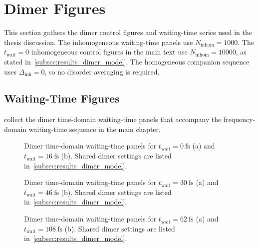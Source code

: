 \clearpage
\section{Dimer Figures}
\label{app:sec:paper_eqs_dimer}

This section gathers the dimer control figures and waiting-time series used in
the thesis discussion. The inhomogeneous waiting-time panels use
$N_{\mathrm{inhom}}=1000$. The \(t_{\mathrm{wait}}=0\) inhomogeneous control
figures in the main text use \(N_{\mathrm{inhom}}=10000\), as stated
in~\autoref{subsec:results_dimer_model}. The homogeneous companion sequence uses
\(\Delta_{\mathrm{inh}}=0\), so no disorder averaging is required.

\subsection{Waiting-Time Figures}

collect the dimer time-domain waiting-time panels that accompany the
frequency-domain waiting-time sequence in the main chapter.

\begin{figure}[htbp]
    \centering
    \caption{Dimer time-domain waiting-time panels for
    \(t_{\mathrm{wait}}=\SI{0}{\femto\second}\) (a) and
    \(t_{\mathrm{wait}}=\SI{16}{\femto\second}\) (b). Shared dimer settings
    are listed in~\autoref{subsec:results_dimer_model}.}
    \label{fig:app_dimer_fig4_time_t0_t16}
\end{figure}

\begin{figure}[htbp]
    \centering
    \caption{Dimer time-domain waiting-time panels for
    \(t_{\mathrm{wait}}=\SI{30}{\femto\second}\) (a) and
    \(t_{\mathrm{wait}}=\SI{46}{\femto\second}\) (b). Shared dimer settings
    are listed in~\autoref{subsec:results_dimer_model}.}
    \label{fig:app_dimer_fig4_time_t30_t46}
\end{figure}

\begin{figure}[htbp]
    \centering
    \caption{Dimer time-domain waiting-time panels for
    \(t_{\mathrm{wait}}=\SI{62}{\femto\second}\) (a) and
    \(t_{\mathrm{wait}}=\SI{108}{\femto\second}\) (b). Shared dimer settings
    are listed in~\autoref{subsec:results_dimer_model}.}
    \label{fig:app_dimer_fig4_time_t62_t108}
\end{figure}

